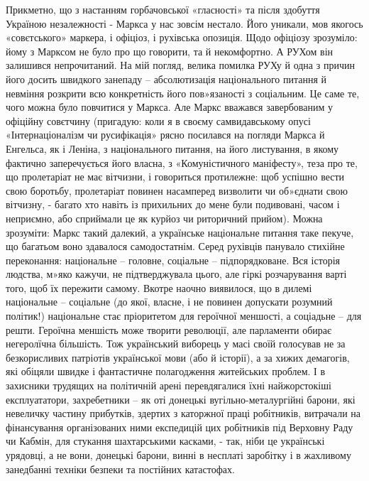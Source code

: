 \documentclass{kapital}
\begin{document}
	Прикметно, що з настанням горбачовської «гласності» та після здобуття Україною незалежності - Маркса у нас зовсім нестало. Його уникали, мов якогось «совєтського» маркера, і офіціоз, і рухівська опозиція. Щодо офіціозу зрозуміло: йому з Марксом не було про що говорити, та й некомфортно. А РУХом він залишився непрочитаний. На мій погляд, велика помилка РУХу й одна з причин його досить швидкого занепаду – абсолютизація національного питання й невміння розкрити всю конкретність його пов»язаності з соціальним. Це саме те, чого можна було повчитися у Маркса. Але Маркс вважався завербованим у офіційну совєтчину (пригадую: коли я в своєму самвидавському опусі «Інтернаціоналізм чи русифікація» рясно посилався на погляди Маркса й Енгельса, як і Леніна, з національного питання, на його листування, в якому фактично заперечується його власна, з «Комуністичного маніфесту», теза про те, що пролетаріат не має вітчизни, і говориться протилежне: щоб успішно вести свою боротьбу, пролетаріат повинен насамперед визволити чи об»єднати свою вітчизну, - багато хто навіть із прихильних до мене були подивовані, часом і неприємно, або сприймали це як курйоз  чи риторичний прийом). Можна зрозуміти: Маркс такий далекий, а українське національне питання таке пекуче, що багатьом воно здавалося самодостатнім. Серед рухівців панувало стихійне переконання: національне – головне, соціальне – підпорядковане. Вся історія людства, м»яко кажучи, не підтверджувала цього, але гіркі розчарування варті того, щоб їх пережити самому. Вкотре наочно виявилося, що в дилемі національне – соціальне (до якої, власне, і не повинен допускати розумний політик!) національне стає пріоритетом для героїчної меншості, а соціадьне – для решти. Героїчна меншість може творити революції, але парламенти обирає негеролїчна більшість. Тож український виборець у масі своїй голосував не за безкорисливих патріотів української мови (або й історії), а за хижих демагогів, які обіцяли швидке і фантастичне полагодження житейських проблем.  І в захисники трудящих на політичній арені  перевдягалися їхні найжорстокіші експлуататори, захребетники – як оті донецькі вугільно-металургійні барони, які невеличку частину прибутків, здертих з каторжної праці робітників, витрачали на фінансування організованих ними експедицій цих робітників під Верховну Раду чи Кабмін, для стукання шахтарськими касками, - так, ніби це українські урядовці, а не вони, донецькі барони, винні в несплаті заробітку і в жахливому занедбанні техніки безпеки та  постійних катастофах. 
 
\end{document}
